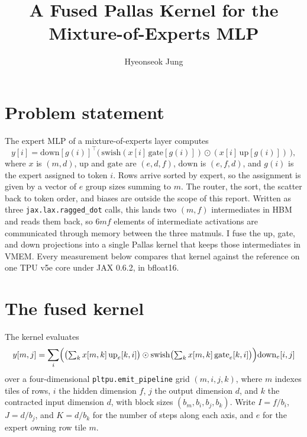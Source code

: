 \documentclass[10pt]{article}
\title{A Fused Pallas Kernel for the Mixture-of-Experts MLP}
\author{Hyeonseok Jung}
\date{}
\begin{document}
\maketitle

\section{Problem statement}

The expert MLP of a mixture-of-experts layer computes
\begin{equation}
  y[i] = \mathrm{down}[g(i)]^{\top}
         \bigl(\, \mathrm{swish}(x[i]\,\mathrm{gate}[g(i)]) \odot
         (x[i]\,\mathrm{up}[g(i)]) \,\bigr),
  \label{eq:op}
\end{equation}
where $x$ is $(m, d)$, $\mathrm{up}$ and $\mathrm{gate}$ are $(e, d, f)$,
$\mathrm{down}$ is $(e, f, d)$, and $g(i)$ is the expert assigned to token
$i$. Rows arrive sorted by expert, so the assignment is given by a vector of
$e$ group sizes summing to $m$. The router, the sort, the scatter back to
token order, and biases are outside the scope of this report. Written as
three \texttt{jax.lax.ragged\_dot} calls, this lands two $(m, f)$
intermediates in HBM and reads them back, so $6mf$ elements of intermediate
activations are communicated through memory between the three matmuls. I
fuse the up, gate, and down projections into a single Pallas kernel that
keeps those intermediates in VMEM. Every measurement below compares that
kernel against the reference on one TPU v5e core under JAX 0.6.2, in
bfloat16.

\section{The fused kernel}

The kernel evaluates
\begin{equation}
  y[m, j] = \sum_i
    \Bigl( \bigl(\textstyle\sum_k x[m,k]\,\mathrm{up}_e[k,i]\bigr)
    \odot \mathrm{swish}\bigl(\textstyle\sum_k x[m,k]\,\mathrm{gate}_e[k,i]\bigr) \Bigr)
    \mathrm{down}_e[i,j]
\end{equation}
over a four-dimensional \texttt{pltpu.emit\_pipeline} grid $(m, i, j, k)$,
where $m$ indexes tiles of rows, $i$ the hidden dimension $f$, $j$ the
output dimension $d$, and $k$ the contracted input dimension $d$, with block
sizes $(b_m, b_i, b_j, b_k)$. Write $I = f/b_i$, $J = d/b_j$, and
$K = d/b_k$ for the number of steps along each axis, and $e$ for the expert
owning row tile $m$.
\end{document}

